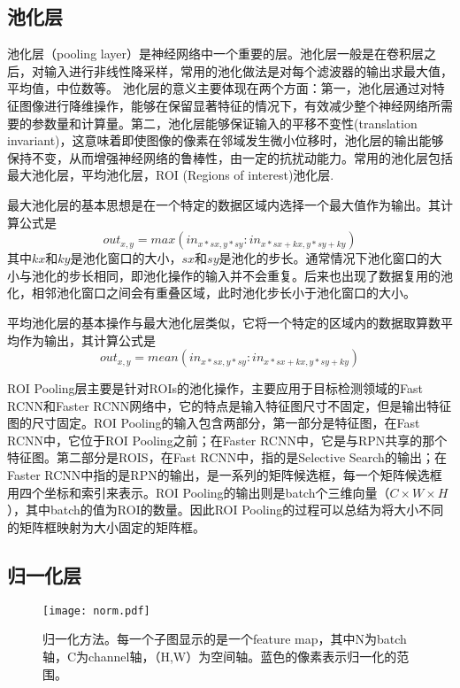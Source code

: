 \subsection{池化层}
池化层（pooling layer）是神经网络中一个重要的层。池化层一般是在卷积层之后，对输入进行非线性降采样，常用的池化做法是对每个滤波器的输出求最大值，平均值，中位数等。
池化层的意义主要体现在两个方面：第一，池化层通过对特征图像进行降维操作，能够在保留显著特征的情况下，有效减少整个神经网络所需要的参数量和计算量。第二，池化层能够保证输入的平移不变性(translation invariant)，这意味着即使图像的像素在邻域发生微小位移时，池化层的输出能够保持不变，从而增强神经网络的鲁棒性，由一定的抗扰动能力。常用的池化层包括最大池化层，平均池化层，ROI (Regions of interest)池化层.

最大池化层的基本思想是在一个特定的数据区域内选择一个最大值作为输出。其计算公式是
\begin{equation}
out_{x,y} = max(in_{x*sx,y*sy}:in_{x*sx+kx,y*sy+ky})
\end{equation}
其中$kx$和$ky$是池化窗口的大小，$sx$和$sy$是池化的步长。通常情况下池化窗口的大小与池化的步长相同，即池化操作的输入并不会重复。后来也出现了数据复用的池化，相邻池化窗口之间会有重叠区域，此时池化步长小于池化窗口的大小。


平均池化层的基本操作与最大池化层类似，它将一个特定的区域内的数据取算数平均作为输出，其计算公式是
\begin{equation}
out_{x,y}=mean(in_{x*sx,y*sy}:in_{x*sx+kx,y*sy+ky})
\end{equation}

ROI Pooling层主要是针对ROIs的池化操作，主要应用于目标检测领域的Fast RCNN和Faster RCNN网络中，它的特点是输入特征图尺寸不固定，但是输出特征图的尺寸固定。ROI Pooling的输入包含两部分，第一部分是特征图，在Fast RCNN中，它位于ROI Pooling之前；在Faster RCNN中，它是与RPN共享的那个特征图。第二部分是ROIS，在Fast RCNN中，指的是Selective Search的输出；在Faster RCNN中指的是RPN的输出，是一系列的矩阵候选框，每一个矩阵候选框用四个坐标和索引来表示。ROI Pooling的输出则是batch个三维向量（$C \times W\times H$），其中batch的值为ROI的数量。因此ROI Pooling的过程可以总结为将大小不同的矩阵框映射为大小固定的矩阵框。
 

\subsection{归一化层}

\begin{figure}[b]
  \centering
  \texttt{[image: norm.pdf]}
  \caption{\footnotesize 归一化方法。每一个子图显示的是一个feature map，其中N为batch轴，C为channel轴，（H,W）为空间轴。蓝色的像素表示归一化的范围。}
  \label{fig:norm}
\end{figure}

